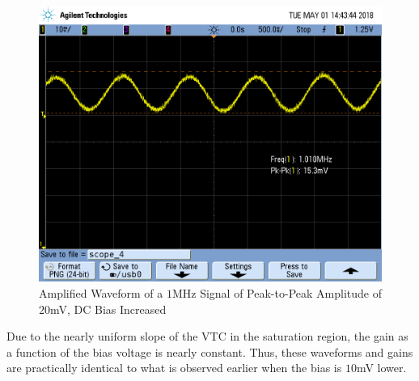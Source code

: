 \FloatBarrier

\begin{figure}[h!]
	\centering
	\includegraphics[scale=0.45]{./images/SCOPE_4.PNG}
	\caption{Amplified Waveform of a $1$\si{\mega\hertz} Signal of Peak-to-Peak Amplitude of $20$\si{\milli\volt}, DC Bias Increased}
	\label{fig:SCOPE_4}
\end{figure}

\FloatBarrier

Due to the nearly uniform slope of the VTC in the saturation region, the gain as a function of the bias voltage is nearly constant.
Thus, these waveforms and gains are practically identical to what is observed earlier when the bias is $10$\si{\milli\volt} lower.
